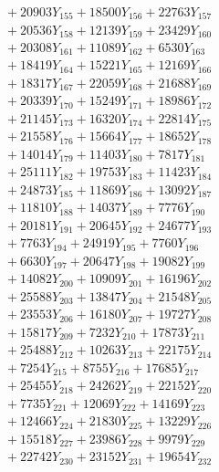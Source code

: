 \documentclass[a4paper,10pt]{article}
\begin{document}
{\begin{align}
&\;  + 20903 Y_{155} + 18500 Y_{156} + 22763 Y_{157} \\[0.3ex]
&\;  + 20536 Y_{158} + 12139 Y_{159} + 23429 Y_{160} \\[0.3ex]
&\;  + 20308 Y_{161} + 11089 Y_{162} + 6530 Y_{163} \\[0.3ex]
&\;  + 18419 Y_{164} + 15221 Y_{165} + 12169 Y_{166} \\[0.3ex]
&\;  + 18317 Y_{167} + 22059 Y_{168} + 21688 Y_{169} \\[0.3ex]
&\;  + 20339 Y_{170} + 15249 Y_{171} + 18986 Y_{172} \\[0.3ex]
&\;  + 21145 Y_{173} + 16320 Y_{174} + 22814 Y_{175} \\[0.3ex]
&\;  + 21558 Y_{176} + 15664 Y_{177} + 18652 Y_{178} \\[0.5ex]\allowbreak
&\;  + 14014 Y_{179} + 11403 Y_{180} + 7817 Y_{181} \\[0.3ex]
&\;  + 25111 Y_{182} + 19753 Y_{183} + 11423 Y_{184} \\[0.3ex]
&\;  + 24873 Y_{185} + 11869 Y_{186} + 13092 Y_{187} \\[0.3ex]
&\;  + 11810 Y_{188} + 14037 Y_{189} + 7776 Y_{190} \\[0.3ex]
&\;  + 20181 Y_{191} + 20645 Y_{192} + 24677 Y_{193} \\[0.3ex]
&\;  + 7763 Y_{194} + 24919 Y_{195} + 7760 Y_{196} \\[0.3ex]
&\;  + 6630 Y_{197} + 20647 Y_{198} + 19082 Y_{199} \\[0.3ex]
&\;  + 14082 Y_{200} + 10909 Y_{201} + 16196 Y_{202} \\[0.3ex]
&\;  + 25588 Y_{203} + 13847 Y_{204} + 21548 Y_{205} \\[0.3ex]
&\;  + 23553 Y_{206} + 16180 Y_{207} + 19727 Y_{208} \\[0.5ex]\allowbreak
&\;  + 15817 Y_{209} + 7232 Y_{210} + 17873 Y_{211} \\[0.3ex]
&\;  + 25488 Y_{212} + 10263 Y_{213} + 22175 Y_{214} \\[0.3ex]
&\;  + 7254 Y_{215} + 8755 Y_{216} + 17685 Y_{217} \\[0.3ex]
&\;  + 25455 Y_{218} + 24262 Y_{219} + 22152 Y_{220} \\[0.3ex]
&\;  + 7735 Y_{221} + 12069 Y_{222} + 14169 Y_{223} \\[0.3ex]
&\;  + 12466 Y_{224} + 21830 Y_{225} + 13229 Y_{226} \\[0.3ex]
&\;  + 15518 Y_{227} + 23986 Y_{228} + 9979 Y_{229} \\[0.3ex]
&\;  + 22742 Y_{230} + 23152 Y_{231} + 19654 Y_{232} \\[0.3ex]

\end{align}}
\end{document}
